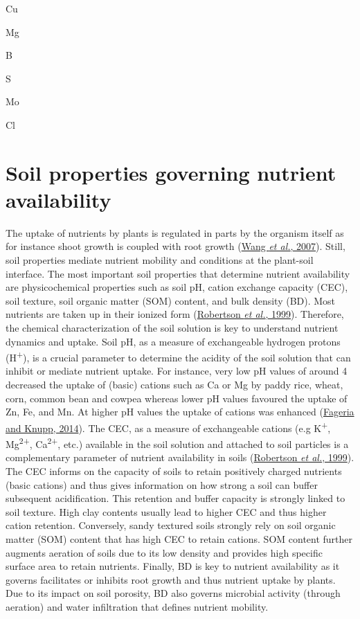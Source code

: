 \documentclass[
  10pt,
  b5paper,
  oneside]{book}
\begin{document}
Cu

Mg

B

S

Mo

Cl

\hypertarget{soil-properties-governing-nutrient-availability}{%
\section{Soil properties governing nutrient availability}\label{soil-properties-governing-nutrient-availability}}

The uptake of nutrients by plants is regulated in parts by the organism itself as for instance shoot growth is coupled with root growth (\protect\hyperlink{ref-wang2007}{Wang \emph{et al.}, 2007}). Still, soil properties mediate nutrient mobility and conditions at the plant-soil interface. The most important soil properties that determine nutrient availability are physicochemical properties such as soil pH, cation exchange capacity (CEC), soil texture, soil organic matter (SOM) content, and bulk density (BD).
Most nutrients are taken up in their ionized form (\protect\hyperlink{ref-robertson1999}{Robertson \emph{et al.}, 1999}). Therefore, the chemical characterization of the soil solution is key to understand nutrient dynamics and uptake.
Soil pH, as a measure of exchangeable hydrogen protons (H\textsuperscript{+}), is a crucial parameter to determine the acidity of the soil solution that can inhibit or mediate nutrient uptake. For instance, very low pH values of around 4 decreased the uptake of (basic) cations such as Ca or Mg by paddy rice, wheat, corn, common bean and cowpea whereas lower pH values favoured the uptake of Zn, Fe, and Mn. At higher pH values the uptake of cations was enhanced (\protect\hyperlink{ref-fageria2014}{Fageria and Knupp, 2014}).
The CEC, as a measure of exchangeable cations (e.g K\textsuperscript{+}, Mg\textsuperscript{2+}, Ca\textsuperscript{2+}, etc.) available in the soil solution and attached to soil particles is a complementary parameter of nutrient availability in soils (\protect\hyperlink{ref-robertson1999}{Robertson \emph{et al.}, 1999}). The CEC informs on the capacity of soils to retain positively charged nutrients (basic cations) and thus gives information on how strong a soil can buffer subsequent acidification. This retention and buffer capacity is strongly linked to soil texture. High clay contents usually lead to higher CEC and thus higher cation retention. Conversely, sandy textured soils strongly rely on soil organic matter (SOM) content that has high CEC to retain cations.
SOM content further augments aeration of soils due to its low density and provides high specific surface area to retain nutrients.
Finally, BD is key to nutrient availability as it governs facilitates or inhibits root growth and thus nutrient uptake by plants. Due to its impact on soil porosity, BD also governs microbial activity (through aeration) and water infiltration that defines nutrient mobility.
\end{document}
